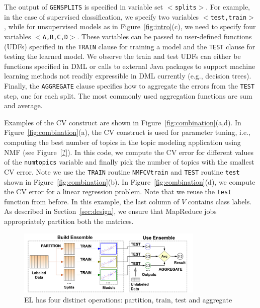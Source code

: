 \documentclass{vldb}
\begin{document}

The output of {\tt GENSPLITS} is specified in variable set $<${\tt splits}$>$.
For example, in the case of supervised classification, we specify two variables
$<${\tt test,train}$>$, while for
unsupervised models as in Figure~\ref{fig:intro}(c), we need to specify four
variables $<${\tt A,B,C,D}$>$. These variables can be passed to user-defined
functions (UDFs) specified in the {\tt TRAIN} clause for training a model and
the {\tt TEST} clause for testing the learned model.
We observe the train and test UDFs can either be functions specified in DML
or calls to external Java packages to support machine learning methods not
readily expressible in DML currently (e.g., decision trees).
Finally, the {\tt AGGREGATE} clause specifies how to aggregate the errors
from the {\tt TEST} step, one for each split.
The most commonly used aggregation functions are sum and average.

Examples of the CV construct are shown in Figure~\ref{fig:combination}(a,d).
In Figure~\ref{fig:combination}(a), the CV construct is used for parameter tuning,
i.e., computing the best number of topics in the topic modeling application using NMF
(see Figure~\ref{?}).
In this code, we compute the CV error for different values of
the {\tt numtopics} variable and finally pick the number of topics
with the smallest CV error.
Note we use the {\tt TRAIN} routine {\tt NMFCVtrain} and {\tt TEST} routine
{\tt test} shown in Figure~\ref{fig:combination}(b).
In Figure~\ref{fig:combination}(d), we compute
the CV error for a linear regression problem. Note that we reuse
the {\tt test} function from before.
In this example, the last column of $V$ contains class labels. As described in
Section~\ref{sec:design}, we ensure that MapReduce jobs appropriately
partition both the matrices.

\begin{figure}
\centering
\includegraphics[width=3.5in]{meta/el.pdf}
\caption{EL has four distinct operations: partition, train, test
and aggregate}
\label{fig:el}
\end{figure}
\end{document}
